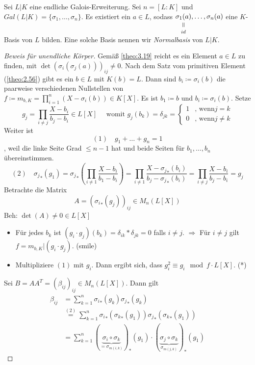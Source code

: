 \documentclass[../main.tex]{subfiles}
\begin{document}
\begin{theorem}
    Sei $L|K$ eine endliche Galois-Erweiterung. Sei $n = [L:K]$ und $Gal(L|K) = \{\sigma_1,\dots,\sigma_n\}$.
    Es existiert ein $a\in L$, sodass $\equalto{\sigma_1(a)}{id},\dots,\sigma_n(a)$ eine $K$-Basis von $L$ bilden.
    Eine solche Basis nennen wir \emph{Normalbasis} von $L|K$.
\end{theorem}
\begin{proof} [Beweis für unendliche Körper]
    Gemäß \ref{theo:3.19} reicht es ein Element $a\in L$ zu finden, mit $\det(\sigma_i(\sigma_j(a)))_{ij}\neq 0$.
    Nach dem Satz vom primitiven Element (\ref{theo:2.56}) gibt es ein $b\in L$ mit $K(b)=L$.
    Dann sind $b_i\coloneqq\sigma_i(b)$ die paarweise verschiedenen Nullstellen von $f\coloneqq m_{b,K}=\prod_{i=1}^n (X-\sigma_i(b))\in K[X]$.
    Es ist $b_1\coloneqq b$ und $b_i \coloneqq \sigma_i(b)$.
    Setze $$g_j = \prod_{i\neq j}\frac{X-b_i}{b_j-b_i}\in L[X]\quad\text{ womit }g_j(b_k) = \delta_{jk} = \begin{cases}
        1 & \text{, wenn} j=k\\
        0 & \text{, wenn} j\neq k
    \end{cases}$$
    Weiter ist 
    $$(1)\quad g_1+\dots+g_n=1$$, weil die linke Seite Grad $\leq n-1$ hat und beide Seiten für $b_1,\dots,b_n$ übereinstimmen.
    $$(2)\quad {\sigma_{j}}_*(g_1) = {\sigma_{j}}_*\left(\prod_{i\neq 1}\frac{X-b_i}{b_1-b_i}\right) = \prod_{i\neq 1}\frac{X-{\sigma_{j}}_*(b_i)}{b_j-{\sigma_{j}}_*(b_i)}=\prod_{i\neq j}\frac{X-b_i}{b_j-b_i} = g_j$$
    Betrachte die Matrix $$A=({\sigma_{i}}_*(g_j))_{ij} \in M_n(L[X])$$
    Beh: $\det(A) \neq 0\in L[X]$
    \begin{itemize}
        \item Für jedes $b_k$ ist $(g_i\cdot g_j)(b_k) = \delta_{ik}*\delta_{jk} = 0$ falls $i\neq j$.
        $\Rightarrow$ Für $i\neq j$ gilt $f= m_{b,K}|(g_i\cdot g_j)$. (smile)
        \item Multipliziere $(1)$ mit $g_i$. Dann ergibt sich, dass $g_i^2 \equiv g_i \mod f\cdot L[X]$. (*)
    \end{itemize}
    Sei $B=AA^T = (\beta_{ij})_{ij} \in M_n(L[X])$.
    Dann gilt 
    \begin{align*}
        \beta_{ij} &= \sum_{k=1}^n{\sigma_{i}}_*(g_k){\sigma_{j}}_* (g_k)\\
        &\overset{(2)}{=} \sum_{k=1}^n{\sigma_{i}}_*({\sigma_k}_*(g_1)){\sigma_{j}}_* ({\sigma_k}_*(g_1))\\
        &= \sum_{k=1}^n (\underbrace{\sigma_i\circ \sigma_k}_{= \sigma_{m(i,k)}})_* (g_1) \cdot (\underbrace{\sigma_j\circ\sigma_k}_{\sigma_{m(j,k)}})_* (g_1)

\end{align*}
\end{proof}
\end{document}
